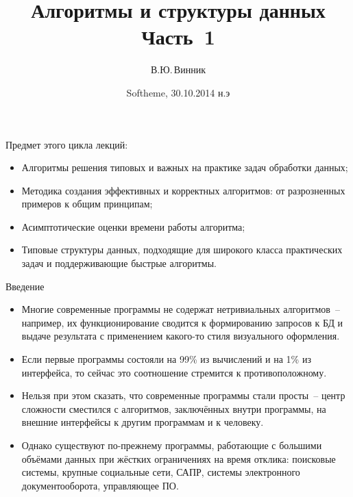 \documentclass[landscape]{slides}
\begin{document}
\author{В.Ю.\,Винник}

\title{Алгоритмы и структуры данных\\
Часть~1}

\date{Softheme, 30.10.2014 н.э}

\maketitle

\begin{slide}
  Предмет этого цикла лекций:
  \begin{itemize}
      \item Алгоритмы решения типовых и важных на практике задач обработки данных;
      \item Методика создания эффективных и корректных алгоритмов: от разрозненных примеров к общим принципам;
      \item Асимптотические оценки времени работы алгоритма;
      \item Типовые структуры данных, подходящие для широкого класса практических задач и поддерживающие быстрые алгоритмы.
    \end{itemize}
\end{slide}

\begin{slide}
  Введение
  \begin{itemize}
    \item Многие современные программы не содержат нетривиальных алгоритмов~-- например, их функционирование сводится
      к формированию запросов к БД и выдаче результата с применением какого-то стиля визуального оформления.
    \item Если первые программы состояли на 99\% из вычислений и на 1\% из интерфейса, то сейчас это соотношение
      стремится к противоположному.
    \item Нельзя при этом сказать, что современные программы стали просты~-- центр сложности сместился с
      алгоритмов, заключённых внутри программы, на внешние интерфейсы к другим программам и к человеку.
    \item Однако существуют по-прежнему программы, работающие с большими объёмами данных при жёстких ограничениях на
      время отклика: поисковые системы, крупные социальные сети, САПР, системы электронного документооборота, управляющее ПО.
  \end{itemize}
\end{slide}
\end{document}
